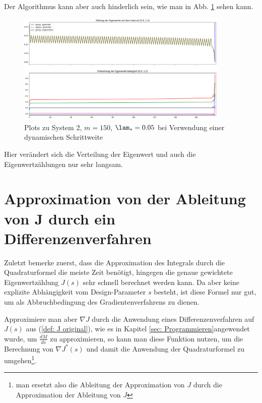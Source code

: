 \documentclass[a4paper,12pt]{report}
\newcommand{\1}{\mathds{1}}
\theoremstyle{plain} %
\theoremstyle{definition} %
\theoremstyle{remark}
\begin{document}
            Der Algorithmus kann aber auch hinderlich sein, wie man in Abb. \ref{fig: Plot_2_150_0.05_dynamischSchritt} sehen kann.
            \begin{figure}[ht]
                  \centering
                  \includegraphics[width=0.9\textwidth, keepaspectratio]{./Verbesserung_dynamischeSchrittweite/Plot_2_150_0.05.png}
                  \caption{Plots zu System 2, $m=150$, $\lam_*=0.05$ bei Verwendung einer dynamischen Schrittweite}
                  \label{fig: Plot_2_150_0.05_dynamischSchritt}
            \end{figure}

            Hier verändert sich die Verteilung der Eigenwert und auch die Eigenwertzählungen nur sehr langsam.

      \section{Approximation von der Ableitung von J durch ein Differenzenverfahren}

            Zuletzt bemerke zuerst, dass die Approximation des Integrals durch die Quadraturformel die meiste Zeit benötigt, hingegen die genaue gewichtete Eigenwertzählung $J(s)$ sehr schnell berechnet werden kann.
            Da aber keine explizite Abhängigkeit vom Design-Parameter $s$ besteht, ist diese Formel nur gut, um als Abbruchbedingung des Gradientenverfahrens zu dienen.

            Approximiere man aber $\nabla J$ durch die Anwendung eines Differenzenverfahren auf $J(s)$ aus (\ref{def: J original}), wie es in Kapitel \ref{sec: Programmieren}angewendet wurde, um $\frac {dM}{ds}$ zu approximieren,
            so kann man diese Funktion nutzen, um die Berechnung von $\nabla J^*(s)$ und damit die Anwendung der Quadraturformel zu umgehen\footnote{man ersetzt also die Ableitung der Approximation von $J$ durch die Approximation der Ableitung von $J$}.
\end{document}
